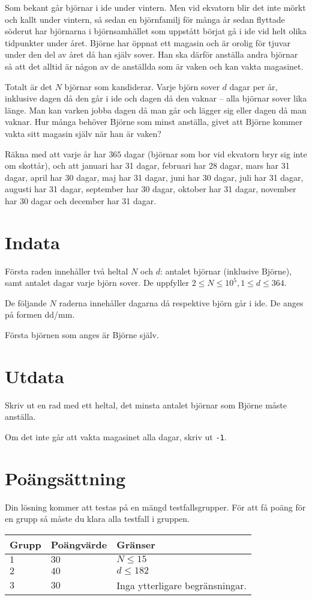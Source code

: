 Som bekant går björnar i ide under vintern. Men vid ekvatorn blir det inte mörkt och kallt under vintern,
så sedan en björnfamilj för många år sedan flyttade söderut har björnarna i björnsamhället som uppstått
börjat gå i ide vid helt olika tidpunkter under året.
Björne har öppnat ett magasin och är orolig för tjuvar under den del av året då han själv sover.
Han ska därför anställa andra björnar så att det alltid är någon av de anställda som är vaken och kan vakta magasinet.

Totalt är det $N$ björnar som kandiderar. Varje björn sover $d$ dagar per år,
inklusive dagen då den går i ide och dagen då den vaknar -- alla björnar sover lika länge.
Man kan varken jobba dagen då man går och lägger sig eller dagen då man vaknar.
Hur många behöver Björne som minst anställa, givet att Björne kommer vakta sitt magasin själv när han är vaken?

Räkna med att varje år har $365$ dagar (björnar som bor vid ekvatorn bryr sig inte om skottår), och att
januari har 31 dagar,
februari har 28 dagar,
mars har 31 dagar,
april har 30 dagar,
maj har 31 dagar,
juni har 30 dagar,
juli har 31 dagar,
augusti har 31 dagar,
september har 30 dagar,
oktober har 31 dagar,
november har 30 dagar och
december har 31 dagar.

\section*{Indata}
Första raden innehåller två heltal $N$ och $d$: antalet björnar (inklusive Björne),
samt antalet dagar varje björn sover.
De uppfyller $2 \le N \le 10^5, 1 \le d \le 364$.

De följande $N$ raderna innehåller dagarna då respektive björn går i ide. De anges på formen dd/mm.

Första björnen som anges är Björne själv.

\section*{Utdata}
Skriv ut en rad med ett heltal, det minsta antalet björnar som Björne måste anställa.

Om det inte går att vakta magasinet alla dagar, skriv ut \texttt{-1}.

\section*{Poängsättning}
Din lösning kommer att testas på en mängd testfallsgrupper.
För att få poäng för en grupp så måste du klara alla testfall i gruppen.

\noindent
\begin{tabular}{| l | l | l |}
\hline
Grupp & Poängvärde & Gränser \\ \hline
$1$   & $30$       & $N \leq 15$ \\ \hline
$2$   & $40$       & $d \leq 182$ \\ \hline
$3$   & $30$       & Inga ytterligare begränsningar. \\ \hline
\end{tabular}
